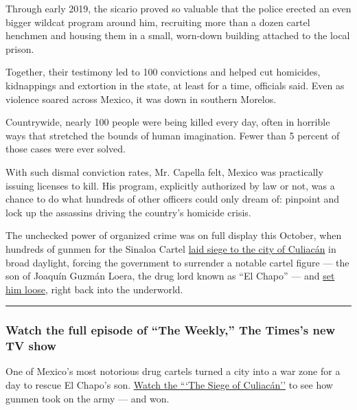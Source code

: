 Through early 2019, the sicario proved so valuable that the police
erected an even bigger wildcat program around him, recruiting more than
a dozen cartel henchmen and housing them in a small, worn-down building
attached to the local prison.

Together, their testimony led to 100 convictions and helped cut
homicides, kidnappings and extortion in the state, at least for a time,
officials said. Even as violence soared across Mexico, it was down in
southern Morelos.

Countrywide, nearly 100 people were being killed every day, often in
horrible ways that stretched the bounds of human imagination. Fewer than
5 percent of those cases were ever solved.

With such dismal conviction rates, Mr. Capella felt, Mexico was
practically issuing licenses to kill. His program, explicitly authorized
by law or not, was a chance to do what hundreds of other officers could
only dream of: pinpoint and lock up the assassins driving the country's
homicide crisis.

The unchecked power of organized crime was on full display this October,
when hundreds of gunmen for the Sinaloa Cartel
\href{https://www.nytimes.com/2019/10/20/world/americas/culiacan-mexico-chapo-son.html}{laid
siege to the city of Culiacán} in broad daylight, forcing the government
to surrender a notable cartel figure --- the son of Joaquín Guzmán
Loera, the drug lord known as ``El Chapo'' --- and
\href{https://www.nytimes.com/2019/10/18/world/americas/mexico-cartel-chapo-son-guzman.html}{set
him loose}, right back into the underworld.

\begin{center}\rule{0.5\linewidth}{\linethickness}\end{center}

\hypertarget{watch-the-full-episode-of-the-weekly-the-timess-new-tv-show}{%
\subsubsection{Watch the full episode of ``The Weekly,'' The Times's new
TV
show}\label{watch-the-full-episode-of-the-weekly-the-timess-new-tv-show}}

One of Mexico's most notorious drug cartels turned a city into a war
zone for a day to rescue El Chapo's son.
\href{https://www.nytimes.com/2019/11/15/the-weekly/el-chapo-guzman-son.html}{Watch
the ```The Siege of Culiacán''} to see how gunmen took on the army ---
and won.

